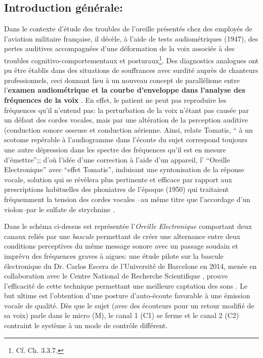 \subsection* {Introduction générale:}
Dans le contexte d'étude des troubles de
l'oreille présentés chez des employés de l'aviation militaire
française, il décèle, à l'aide
de tests audiométriques
 (1947), des pertes auditives accompagnées d'une
déformation de la voix associée à des troubles
cognitivo-comportementaux et posturaux\footnote{Cf. Ch. 3.3.7.}.
Des diagnostics analogues ont pu être établis dans des situations
de souffrances avec surdité auprès de chanteurs professionnels,
ceci donnant lieu
à un nouveau concept de
parallélisme entre l'\textbf{examen audiométrique et la courbe
d'enveloppe dans l'analyse des fréquences de la voix} \autocite {tomatisoreilletvie}.
En effet, le patient ne peut pas reproduire les fréquences qu'il
n'entend pas:
la perturbation de la voix n'étant pas causée par un défaut des cordes
vocales, mais par une altération de la perception auditive (conduction
sonore osseuse et conduction aérienne. Ainsi, relate Tomatis, \enquote{ à un scotome repérable à l'audiogramme dans l'écoute du sujet correspond toujours une autre dépression dans les spectre des fréquences qu'il est en mesure d'émettre};\autocite [75] {tomatisoreilletvie}; d'où
l'idée d'une correction à l'aide d'un appareil, l' ``Oreille
Electronique'' avec ``effet Tomatis'', induisant
une syntonisation de la réponse vocale, solution qui se révèlera plus pertinente et efficace par rapport aux prescriptions habituelles des phoniatres de
l'époque (1950) qui traitaient fréquemment la tension des cordes vocales --au même titre que
l'accordage d'un violon--par le sulfate de
strychnine \autocite {tomatisoreilletvie}.

Dans le schéma ci-dessus est représentée l'\textit{Oreille Electronique}
comportant deux canaux reliés par une
\textit{bascule}  permettant de créer une alternance entre deux conditions perceptives du même message sonore avec un passage soudain et imprévu des fréquences graves à aigues: une étude pilote sur la bascule électronique du Dr. Carlos Escera
de l'Université de Barcelone en 2014, menée en collaboration avec le
Centre National de Recherche Scientifique \autocite{escera-key}, prouve l'efficacité de cette technique permettant
une meilleure
captation des sons \href {http://tomatisassociation.org/scientific-validation-of-the-tomatis-effect-
eeg-recordings-of-sound-from-brainstem-to-cerebral-cortex-encoding-university-of
-barcelona-2014/} \autocite {tomatisassociation.org}.
Le but ultime est l'obtention d'une posture d'auto-écoute favorable à une
          émission vocale de qualité.
Dès que le sujet (avec
des écouteurs pour un retour modifié de sa voix) parle
dans le micro (M), le canal 1 (C1) se ferme et  le canal 2 (C2) contraint le
système à un mode de contrôle différent.

